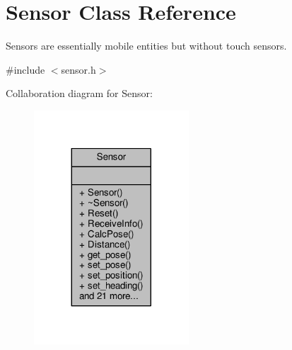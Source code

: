 \hypertarget{classSensor}{}\section{Sensor Class Reference}
\label{classSensor}


Sensors are essentially mobile entities but without touch sensors.  




{\ttfamily \#include $<$sensor.\+h$>$}



Collaboration diagram for Sensor\+:\nopagebreak
\begin{figure}[H]
\begin{center}
\leavevmode
\includegraphics[width=164pt]{classSensor__coll__graph}
\end{center}
\end{figure}
